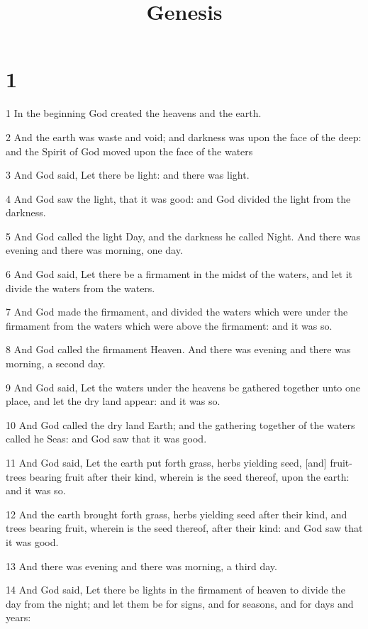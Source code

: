 

\title{Genesis}

\chapter{1}

\par 1 In the beginning God created the heavens and the earth.
\par 2 And the earth was waste and void; and darkness was upon the face of the deep: and the Spirit of God moved upon the face of the waters
\par 3 And God said, Let there be light: and there was light.
\par 4 And God saw the light, that it was good: and God divided the light from the darkness.
\par 5 And God called the light Day, and the darkness he called Night. And there was evening and there was morning, one day.
\par 6 And God said, Let there be a firmament in the midst of the waters, and let it divide the waters from the waters.
\par 7 And God made the firmament, and divided the waters which were under the firmament from the waters which were above the firmament: and it was so.
\par 8 And God called the firmament Heaven. And there was evening and there was morning, a second day.
\par 9 And God said, Let the waters under the heavens be gathered together unto one place, and let the dry land appear: and it was so.
\par 10 And God called the dry land Earth; and the gathering together of the waters called he Seas: and God saw that it was good.
\par 11 And God said, Let the earth put forth grass, herbs yielding seed, [and] fruit-trees bearing fruit after their kind, wherein is the seed thereof, upon the earth: and it was so.
\par 12 And the earth brought forth grass, herbs yielding seed after their kind, and trees bearing fruit, wherein is the seed thereof, after their kind: and God saw that it was good.
\par 13 And there was evening and there was morning, a third day.
\par 14 And God said, Let there be lights in the firmament of heaven to divide the day from the night; and let them be for signs, and for seasons, and for days and years:
